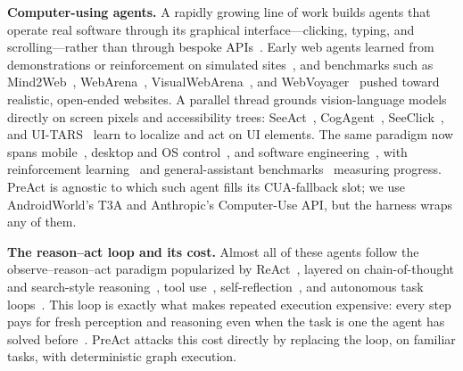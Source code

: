 \documentclass[11pt]{article}
\begin{document}
\textbf{Computer-using agents.} A rapidly growing line of work builds agents that operate real software through its graphical interface---clicking, typing, and scrolling---rather than through bespoke APIs~\cite{anthropic2024computeruse}. Early web agents learned from demonstrations or reinforcement on simulated sites~\cite{nakano2021webgpt,yao2022webshop,gur2024webagent}, and benchmarks such as Mind2Web~\cite{deng2023mind2web}, WebArena~\cite{zhou2024webarena}, VisualWebArena~\cite{koh2024visualwebarena}, and WebVoyager~\cite{he2024webvoyager} pushed toward realistic, open-ended websites. A parallel thread grounds vision-language models directly on screen pixels and accessibility trees: SeeAct~\cite{zheng2024seeact}, CogAgent~\cite{hong2024cogagent}, SeeClick~\cite{cheng2024seeclick}, and UI-TARS~\cite{qin2025uitars} learn to localize and act on UI elements. The same paradigm now spans mobile~\cite{zhang2023appagent,wang2024mobileagent,rawles2023androidwild,rawles2024androidworld}, desktop and OS control~\cite{niu2024screenagent,wu2024oscopilot,zhang2024ufo,bonatti2024windows,xie2024osworld}, and software engineering~\cite{yang2024sweagent,jimenez2024swebench}, with reinforcement learning~\cite{bai2024digirl} and general-assistant benchmarks~\cite{mialon2024gaia} measuring progress. PreAct is agnostic to which such agent fills its CUA-fallback slot; we use AndroidWorld's T3A and Anthropic's Computer-Use API, but the harness wraps any of them.

\textbf{The reason--act loop and its cost.} Almost all of these agents follow the observe--reason--act paradigm popularized by ReAct~\cite{yao2023react}, layered on chain-of-thought and search-style reasoning~\cite{wei2022cot,yao2023tot,wang2023selfconsistency}, tool use~\cite{schick2023toolformer}, self-reflection~\cite{shinn2023reflexion}, and autonomous task loops~\cite{autogpt2023,sumers2024coala}. This loop is exactly what makes repeated execution expensive: every step pays for fresh perception and reasoning even when the task is one the agent has solved before~\cite{lu2024proactive}. PreAct attacks this cost directly by replacing the loop, on familiar tasks, with deterministic graph execution.
\end{document}
